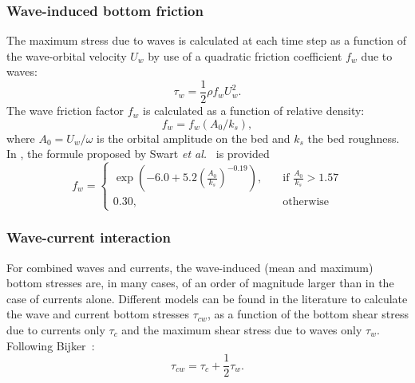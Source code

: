 \subsubsection{Wave-induced bottom friction}
The maximum stress due to waves is calculated at each time step as a
function of the wave-orbital velocity $U_w$ by use of a quadratic
friction coefficient $f_w$ due to waves:
\begin{equation*}
\tau_w = \frac{1}{2}\rho f_w U_w^2. 
\end{equation*}
The wave friction factor $f_w$ is calculated as a function of relative
density:
\begin{equation*}
f_w = f_w \left( A_0/k_s \right), 
\end{equation*}
where $A_0= U_w/\omega$ is the orbital amplitude on the bed and $k_s$ the bed roughness.
In \sisyphe, the formule proposed by Swart \emph{et al.}~\cite{Swart} is provided
\begin{equation*}
f_w = \left\{\begin{array}{ll}
\exp \left(-6.0 + 5.2\left( \frac{A_0}{k_s} \right)^{-0.19}\right), & \quad \text{if } \frac{A_0}{k_s} > 1.57\\
0.30, & \quad \text{otherwise}
\end{array}
\right.
\end{equation*}

\subsubsection{Wave-current interaction}
For combined waves and currents, the wave-induced (mean and maximum) bottom
stresses are, in many cases, of an order of magnitude larger than in the case of currents
alone. Different models can be found in the literature to calculate the wave
and current bottom stresses $\tau_{cw}$, as a function of the bottom
shear stress due to currents only $\tau_c$ and the maximum shear
stress due to waves only $\tau_w$. Following Bijker~\cite{Bijker}:
\begin{equation}\label{eq:tauBijker}
\tau_{cw} = \tau_c + \frac{1}{2} \tau_w. 
\end{equation}

